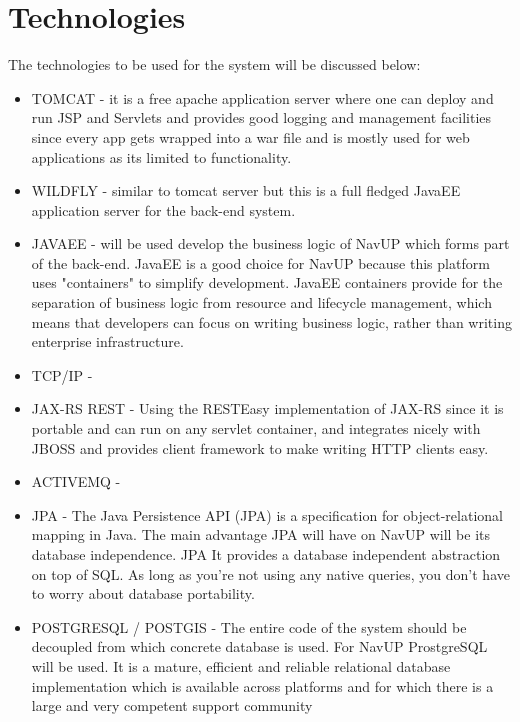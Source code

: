 
\section{Technologies}
The technologies to be used for the system will be discussed below:
\begin{itemize}
	\item TOMCAT - it is a free apache application server where one can deploy and run JSP and Servlets and provides good logging and management facilities since every app gets wrapped into a war file and is mostly used for web applications as its limited to functionality.
	
	\item WILDFLY - similar to tomcat server but this is a full fledged JavaEE application server for the back-end system.
	
	\item JAVAEE - will be used develop the business logic of NavUP which forms part of the back-end. JavaEE is a good choice for NavUP because this platform uses "containers" to simplify development. JavaEE containers provide for the separation of business logic from resource and lifecycle management, which means that developers can focus on writing business logic, rather than writing enterprise infrastructure. 
	
	\item TCP/IP - 
	
	\item JAX-RS REST - Using the RESTEasy implementation of JAX-RS since it is portable and can run on any servlet container, and integrates nicely with JBOSS and provides client framework to make writing HTTP clients easy.
	
	\item ACTIVEMQ - 
	
	\item JPA - The Java Persistence API (JPA) is a specification for object-relational mapping in Java. The main advantage JPA will have on NavUP will be its database independence. JPA It provides a database independent abstraction on top of SQL. As long as you're not using any native queries, you don't have to worry about database portability. 
	
	\item POSTGRESQL / POSTGIS - The entire code of the system should be decoupled from which concrete database is used. For NavUP ProstgreSQL will be used. It is a mature, efficient and reliable relational database implementation which is available across platforms and for which there is a large and very competent support community
	

\end{itemize}
